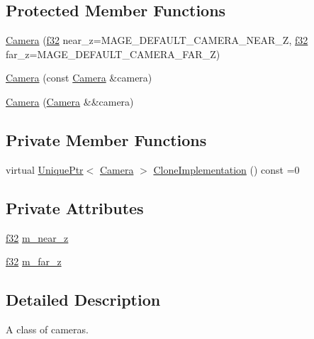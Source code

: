 \subsection*{Protected Member Functions}
\begin{DoxyCompactItemize}
\item 
\hyperlink{classmage_1_1_camera_a9e55584244cf79e9b2cfcb837a06b1f8}{Camera} (\hyperlink{namespacemage_a6a44ad388483959dc4dff9f2aef91431}{f32} near\+\_\+z=M\+A\+G\+E\+\_\+\+D\+E\+F\+A\+U\+L\+T\+\_\+\+C\+A\+M\+E\+R\+A\+\_\+\+N\+E\+A\+R\+\_\+Z, \hyperlink{namespacemage_a6a44ad388483959dc4dff9f2aef91431}{f32} far\+\_\+z=M\+A\+G\+E\+\_\+\+D\+E\+F\+A\+U\+L\+T\+\_\+\+C\+A\+M\+E\+R\+A\+\_\+\+F\+A\+R\+\_\+Z)
\item 
\hyperlink{classmage_1_1_camera_a28d9280bd7067ec4d28392558cc2b767}{Camera} (const \hyperlink{classmage_1_1_camera}{Camera} \&camera)
\item 
\hyperlink{classmage_1_1_camera_a4dc6f31c108b28abe9580ef6d7a06713}{Camera} (\hyperlink{classmage_1_1_camera}{Camera} \&\&camera)
\end{DoxyCompactItemize}
\subsection*{Private Member Functions}
\begin{DoxyCompactItemize}
\item 
virtual \hyperlink{namespacemage_a3316d7143a973e37adf1110f2e80ca31}{Unique\+Ptr}$<$ \hyperlink{classmage_1_1_camera}{Camera} $>$ \hyperlink{classmage_1_1_camera_aedf6e7d6ee6c6e9e82da814ef8e705ab}{Clone\+Implementation} () const =0
\end{DoxyCompactItemize}
\subsection*{Private Attributes}
\begin{DoxyCompactItemize}
\item 
\hyperlink{namespacemage_a6a44ad388483959dc4dff9f2aef91431}{f32} \hyperlink{classmage_1_1_camera_adda0ecc45cf0bab9e0039c0a72b298e3}{m\+\_\+near\+\_\+z}
\item 
\hyperlink{namespacemage_a6a44ad388483959dc4dff9f2aef91431}{f32} \hyperlink{classmage_1_1_camera_a87502cf8235addc141038cf0a992b9ee}{m\+\_\+far\+\_\+z}
\end{DoxyCompactItemize}


\subsection{Detailed Description}
A class of cameras. 


